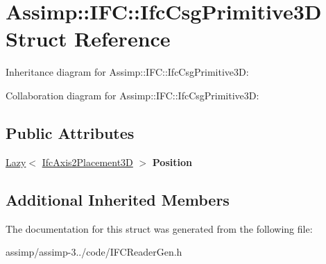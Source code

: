 \hypertarget{struct_assimp_1_1_i_f_c_1_1_ifc_csg_primitive3_d}{\section{Assimp\+:\+:I\+F\+C\+:\+:Ifc\+Csg\+Primitive3\+D Struct Reference}
\label{struct_assimp_1_1_i_f_c_1_1_ifc_csg_primitive3_d}
}


Inheritance diagram for Assimp\+:\+:I\+F\+C\+:\+:Ifc\+Csg\+Primitive3\+D\+:


Collaboration diagram for Assimp\+:\+:I\+F\+C\+:\+:Ifc\+Csg\+Primitive3\+D\+:
\subsection*{Public Attributes}
\begin{DoxyCompactItemize}
\item 
\hypertarget{struct_assimp_1_1_i_f_c_1_1_ifc_csg_primitive3_d_aa1b3d5a48578f069e81ab261efec9adf}{\hyperlink{struct_assimp_1_1_s_t_e_p_1_1_lazy}{Lazy}$<$ \hyperlink{struct_assimp_1_1_i_f_c_1_1_ifc_axis2_placement3_d}{Ifc\+Axis2\+Placement3\+D} $>$ {\bfseries Position}}\label{struct_assimp_1_1_i_f_c_1_1_ifc_csg_primitive3_d_aa1b3d5a48578f069e81ab261efec9adf}

\end{DoxyCompactItemize}
\subsection*{Additional Inherited Members}


The documentation for this struct was generated from the following file\+:\begin{DoxyCompactItemize}
\item 
assimp/assimp-\/3../code/I\+F\+C\+Reader\+Gen.\+h\end{DoxyCompactItemize}
